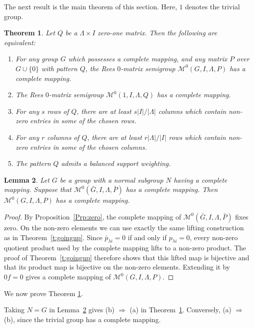 \documentclass[11pt]{article}
\theoremstyle{plain}
\newtheorem{theorem}{Theorem}[section]
\newtheorem{lemma}[theorem]{Lemma}
\theoremstyle{remark}
\theoremstyle{definition}
\theoremstyle{plain}
\begin{document}
{The next result is the main theorem of this section. Here,} $1$ denotes the trivial group.
\begin{theorem}\label{c:Rees0}
Let $Q$ be a $\Lambda\times I$ zero-one matrix. Then the following are
equivalent:
\begin{enumerate}\itemsep0pt
\item For any group $G$ which possesses a complete mapping, and any matrix
$P$ over $G\cup\{0\}$ with pattern $Q$, the Rees $0$-matrix semigroup
$\mathcal{M}^0(G,I,\Lambda,P)$ has a complete mapping.
\item The Rees $0$-matrix semigroup $\mathcal{M}^0(1,I,\Lambda,Q)$ has a
complete mapping.
\item For any $s$ rows of $Q$, there are at least $s|I|/|\Lambda|$ columns
which contain non-zero entries in some of the chosen rows.
\item For any $r$ columns of $Q$, there are at least $r|\Lambda|/|I|$ rows
which contain non-zero entries in some of the chosen columns.
\item {The pattern $Q$ admits a balanced support weighting.}

\end{enumerate}
\end{theorem}

\begin{lemma}\label{l:factorL}
Let $G$ be a group with a normal subgroup $N$ having a complete mapping.
Suppose that $\mathcal{M}^0(\bar G,I,\Lambda,\bar P)$ has a complete
mapping. Then $\mathcal{M}^0(G,I,\Lambda,P)$ has a complete mapping.
\end{lemma}

\begin{proof}
By Proposition~\ref{Prp:zero}, the complete mapping of
$\mathcal M^0(\bar G,I,\Lambda,\bar P)$ fixes zero. On the non-zero elements we can
use exactly the same lifting construction as in Theorem~\ref{t:goingup}.
Since $\bar p_{\lambda i}=0$ if and only if
$p_{\lambda i}=0$, every non-zero quotient product used by the complete
mapping lifts to a non-zero product. The proof of Theorem~\ref{t:goingup}
therefore shows that this lifted map is bijective and that its product map is
bijective on the non-zero elements. Extending it by $0f=0$ gives a complete mapping of
$\mathcal M^0(G,I,\Lambda,P)$.
\end{proof}

We now prove Theorem \ref{c:Rees0}. 

Taking $N=G$ in Lemma~\ref{l:factorL} gives (b) $\Rightarrow$ (a) in Theorem~\ref{c:Rees0}. Conversely, (a) $\Rightarrow$ (b), since the trivial group has a complete mapping.
\end{document}
